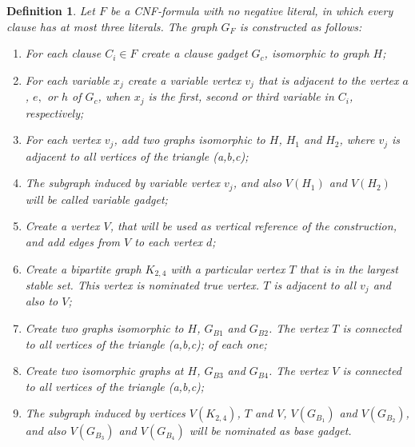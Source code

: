 \documentclass[preprint,12pt]{elsarticle} %
\newtheorem{defi}[theorem]{Definition}
\begin{document}
\begin{defi}\label{sec:reducao}
Let $F$ be a CNF-formula with no negative literal, in which every clause has at most three literals. The graph $G_F$ is constructed as follows:

\begin{enumerate}
\item For each clause $C_i \in F$ create a  \textit{clause gadget} $G_{c}$, isomorphic to  graph $H$;%

\item For each variable $x_{j}$ create a variable vertex $v_{j}$ that is adjacent to the vertex $a$, $e,$ or $h$ of $G_c$, when $x_{j}$ is the first, second or third variable in $C_i$, respectively;

\item For each vertex $v_{j}$, add two graphs  isomorphic to $H$, $H_1$ and $H_2$, where $v_{j}$ is  adjacent to all vertices of the triangle (a,b,c);%

\item The  subgraph induced by \emph{variable vertex}  $v_{j}$, and also $V(H_1)$ and $V(H_2)$ will be called \emph{variable gadget}; 

\item Create a vertex $V$, that will be used as vertical reference of the construction, and add edges from $V$ to each vertex  $d$;%

\item Create a bipartite graph $K_{2,4}$ with a particular vertex $T$ that is in the largest stable set. This vertex is nominated \emph{true vertex}. $T$ is adjacent to all $v_{j}$ and also to $V$;

\item Create two  graphs isomorphic to $H$, $G_{B1}$ and $G_{B2}$. The vertex $T$ is connected to all vertices of the triangle (a,b,c); %
of each one;


\item Create two isomorphic graphs at $H$, $G_{B3}$ and $G_{B4}$. The vertex $V$ is connected to all vertices of the triangle (a,b,c);%

\item The  subgraph induced by vertices $V(K_{2,4})$, $T$ and $V$,  $V(G_{B_1})$ and $V(G_{B_2})$, and also $V(G_{B_3})$ and $V(G_{B_4})$ will be nominated as \emph{base gadget}. 
\end{enumerate}
\end{defi}
\end{document}
